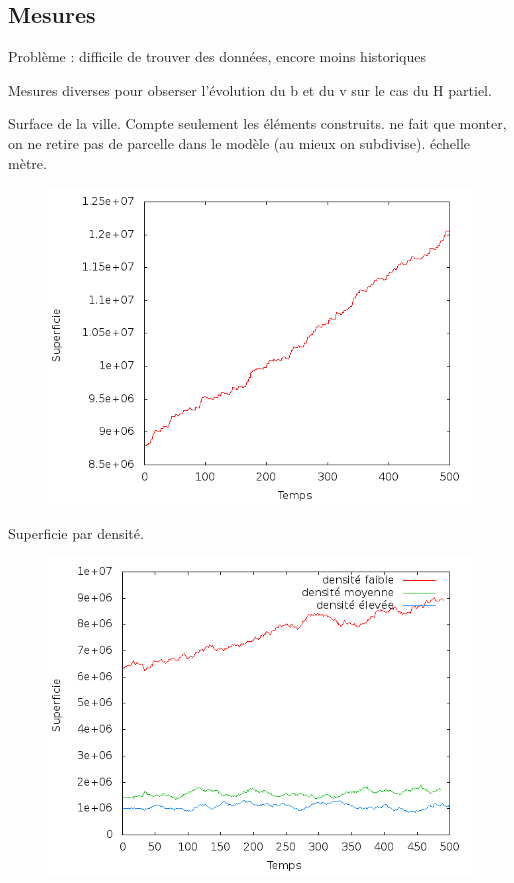 \documentclass[12pt]{article}
\begin{document}
\subsection{Mesures}

Problème : difficile de trouver des données, encore moins historiques

Mesures diverses pour obserser l'évolution du b et du v sur le cas du
H partiel.

Surface de la ville. Compte seulement les éléments construits. ne fait
que monter, on ne retire pas de parcelle dans le modèle (au mieux on subdivise).
échelle mètre.

\begin{figure}[H]
  \centering
  \includegraphics[width=.8\linewidth]{images/area.png}
  \caption{}
\end{figure}

Superficie par densité.

\begin{figure}[H]
  \centering
  \includegraphics[width=.8\linewidth]{images/area_ALL.png}
  \caption{}
\end{figure}
\end{document}
